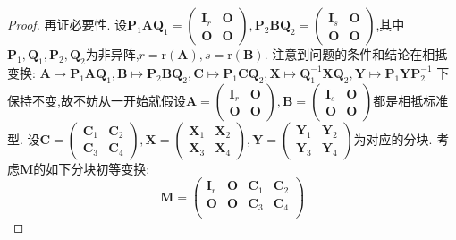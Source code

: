 \documentclass[lang=cn,newtx,10pt,scheme=chinese]{elegantbook}
\begin{document}
\begin{proof}
再证必要性. 设\(\boldsymbol{P}_1\boldsymbol{A}\boldsymbol{Q}_1=\begin{pmatrix}
\boldsymbol{I}_r&\boldsymbol{O}\\
\boldsymbol{O}&\boldsymbol{O}
\end{pmatrix},\boldsymbol{P}_2\boldsymbol{B}\boldsymbol{Q}_2=\begin{pmatrix}
\boldsymbol{I}_s&\boldsymbol{O}\\
\boldsymbol{O}&\boldsymbol{O}
\end{pmatrix}\),其中\(\boldsymbol{P}_1,\boldsymbol{Q}_1,\boldsymbol{P}_2,\boldsymbol{Q}_2\)为非异阵,\(r = \mathrm{r}(\boldsymbol{A}),s=\mathrm{r}(\boldsymbol{B})\). 注意到问题的条件和结论在相抵变换:
\(\boldsymbol{A}\mapsto\boldsymbol{P}_1\boldsymbol{A}\boldsymbol{Q}_1,\boldsymbol{B}\mapsto\boldsymbol{P}_2\boldsymbol{B}\boldsymbol{Q}_2,\boldsymbol{C}\mapsto\boldsymbol{P}_1\boldsymbol{C}\boldsymbol{Q}_2,\boldsymbol{X}\mapsto\boldsymbol{Q}_1^{-1}\boldsymbol{X}\boldsymbol{Q}_2,\boldsymbol{Y}\mapsto\boldsymbol{P}_1\boldsymbol{Y}\boldsymbol{P}_2^{-1}\)
下保持不变,故不妨从一开始就假设\(\boldsymbol{A}=\begin{pmatrix}
\boldsymbol{I}_r&\boldsymbol{O}\\
\boldsymbol{O}&\boldsymbol{O}
\end{pmatrix},\boldsymbol{B}=\begin{pmatrix}
\boldsymbol{I}_s&\boldsymbol{O}\\
\boldsymbol{O}&\boldsymbol{O}
\end{pmatrix}\)都是相抵标准型. 设\(\boldsymbol{C}=\begin{pmatrix}
\boldsymbol{C}_1&\boldsymbol{C}_2\\
\boldsymbol{C}_3&\boldsymbol{C}_4
\end{pmatrix},\boldsymbol{X}=\begin{pmatrix}
\boldsymbol{X}_1&\boldsymbol{X}_2\\
\boldsymbol{X}_3&\boldsymbol{X}_4
\end{pmatrix},\boldsymbol{Y}=\begin{pmatrix}
\boldsymbol{Y}_1&\boldsymbol{Y}_2\\
\boldsymbol{Y}_3&\boldsymbol{Y}_4
\end{pmatrix}\)为对应的分块. 考虑\(\boldsymbol{M}\)的如下分块初等变换:
\[
\boldsymbol{M}=\begin{pmatrix}
\boldsymbol{I}_r&\boldsymbol{O}&\boldsymbol{C}_1&\boldsymbol{C}_2\\
\boldsymbol{O}&\boldsymbol{O}&\boldsymbol{C}_3&\boldsymbol{C}_4\\

\end{pmatrix}\]
\end{proof}
\end{document}
